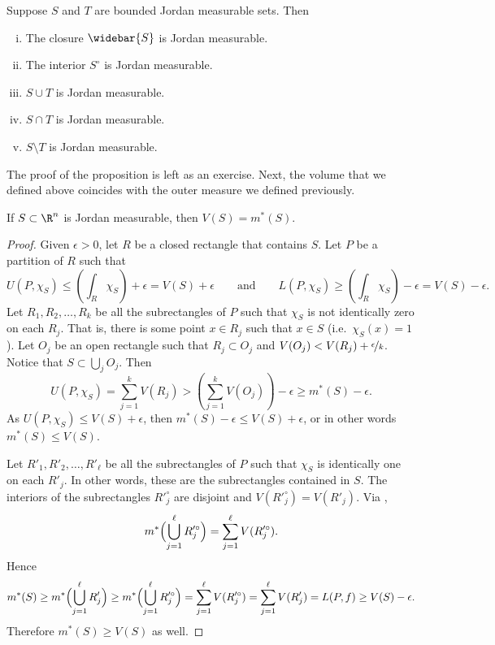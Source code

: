 \begin{prop} \label{prop:jordanmeas}
Suppose $S$ and $T$ are bounded Jordan measurable sets.
Then
\begin{enumerate}[(i)]
\item The closure $\widebar{S}$ is Jordan measurable.
\item The interior $S^\circ$ is Jordan measurable.
\item $S \cup T$ is Jordan measurable.
\item $S \cap T$ is Jordan measurable.
\item $S \setminus T$ is Jordan measurable.
\end{enumerate}
\end{prop}

The proof of the proposition is left as an exercise.
Next, the volume that we defined above coincides with the outer
measure we defined previously.

\begin{prop}
If $S \subset \R^n$ is Jordan measurable, then $V(S) = m^*(S)$.
\end{prop}

\begin{proof}
Given $\epsilon > 0$,
let $R$ be a closed rectangle that contains $S$.  Let $P$ be a partition
of $R$ such that 
\begin{equation*}
U(P,\chi_S) \leq \left( \int_R \chi_S \right) + \epsilon = V(S) + \epsilon
\qquad \text{and} \qquad
L(P,\chi_S) \geq \left( \int_R \chi_S \right) - \epsilon = V(S)-\epsilon.
\end{equation*}
Let $R_1,R_2,\ldots,R_k$ be all the subrectangles of $P$ such that $\chi_S$ is not
identically zero on each $R_j$.  That is, there is some point $x \in R_j$ such
that $x \in S$ (i.e.\ $\chi_S(x)=1$).  Let $O_j$ be an open rectangle such that $R_j \subset O_j$
and $V(O_j) < V(R_j) + \nicefrac{\epsilon}{k}$.  Notice that $S \subset
\bigcup_j O_j$.  Then
\begin{equation*}
U(P,\chi_S) = \sum_{j=1}^k V(R_j) > 
\left(\sum_{j=1}^k V(O_j)\right) - \epsilon \geq m^*(S) - \epsilon .
\end{equation*}
As 
$U(P,\chi_S) \leq V(S) + \epsilon$, then
$m^*(S) - \epsilon \leq V(S) + \epsilon$, or in other words
$m^*(S) \leq V(S)$.

Let $R'_1,R'_2,\ldots,R'_\ell$ be all the subrectangles of $P$ such that
$\chi_S$ is identically one on each $R'_j$.  In other words,
these are the subrectangles contained in $S$.
  The interiors
of the subrectangles $R'^\circ_j$ are disjoint and
$V(R'^\circ_j) = V(R'_j)$.  Via
,
\begin{equation*}
m^*\Bigl(\bigcup_{j=1}^\ell R'^\circ_j\Bigr)
=
\sum_{j=1}^\ell
V(R'^\circ_j) .
\end{equation*}
Hence
\begin{equation*}
m^*(S) \geq
m^*\Bigl(\bigcup_{j=1}^\ell R'_j\Bigr)
\geq
m^*\Bigl(\bigcup_{j=1}^\ell R'^\circ_j\Bigr)
=
\sum_{j=1}^\ell
V(R'^\circ_j)
=
\sum_{j=1}^\ell
V(R'_j)
=
L(P,f) \geq V(S) - \epsilon .
\end{equation*}
Therefore $m^*(S) \geq V(S)$ as well.
\end{proof}

